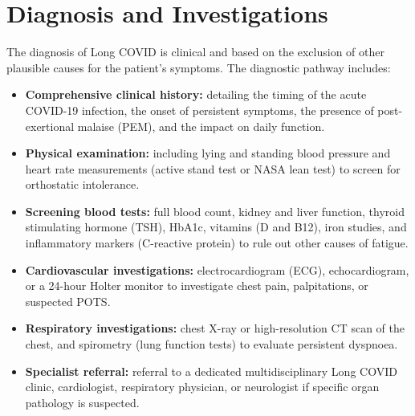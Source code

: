 \section*{Diagnosis and Investigations}
The diagnosis of Long COVID is clinical and based on the exclusion of other plausible causes for the patient's symptoms. The diagnostic pathway includes:
\begin{itemize}
    \item \textbf{Comprehensive clinical history:} detailing the timing of the acute COVID-19 infection, the onset of persistent symptoms, the presence of post-exertional malaise (PEM), and the impact on daily function.
    \item \textbf{Physical examination:} including lying and standing blood pressure and heart rate measurements (active stand test or NASA lean test) to screen for orthostatic intolerance.
    \item \textbf{Screening blood tests:} full blood count, kidney and liver function, thyroid stimulating hormone (TSH), HbA1c, vitamins (D and B12), iron studies, and inflammatory markers (C-reactive protein) to rule out other causes of fatigue.
    \item \textbf{Cardiovascular investigations:} electrocardiogram (ECG), echocardiogram, or a 24-hour Holter monitor to investigate chest pain, palpitations, or suspected POTS.
    \item \textbf{Respiratory investigations:} chest X-ray or high-resolution CT scan of the chest, and spirometry (lung function tests) to evaluate persistent dyspnoea.
    \item \textbf{Specialist referral:} referral to a dedicated multidisciplinary Long COVID clinic, cardiologist, respiratory physician, or neurologist if specific organ pathology is suspected.
\end{itemize}

